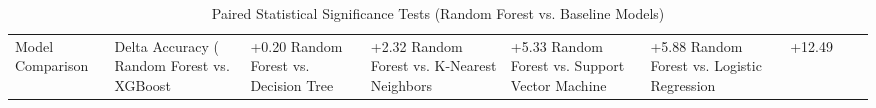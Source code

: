 \begin{table}
\caption{Paired Statistical Significance Tests (Random Forest vs. Baseline Models)}
\label{tab:significance}
\begin{tabular}{lllllllll}
\toprule
Model Comparison & Delta Accuracy (%
\midrule
Random Forest vs. XGBoost & +0.20%
Random Forest vs. Decision Tree & +2.32%
Random Forest vs. K-Nearest Neighbors & +5.33%
Random Forest vs. Support Vector Machine & +5.88%
Random Forest vs. Logistic Regression & +12.49%
\bottomrule
\end{tabular}
\end{table}
